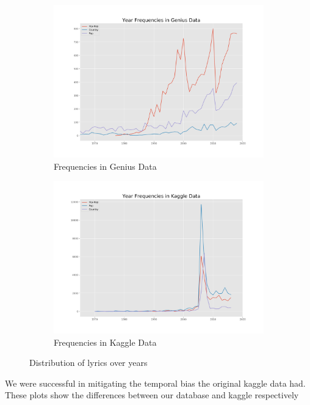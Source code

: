 \documentclass[11pt,a4paper]{article}
\begin{document}
\begin{figure}[t!]
\centering
\begin{subfigure}[t]{0.49\textwidth}
\centering
\includegraphics[width=\textwidth]{genius_histogram_line}
\caption{Frequencies in Genius Data}
\label{fig:histograms:genius}
\end{subfigure}
\begin{subfigure}[t]{0.49\textwidth}
\centering
\includegraphics[width=\textwidth]{kaggle_histogram_line}
\caption{Frequencies in Kaggle Data}
\label{fig:histograms:kaggle}
\end{subfigure}
\caption{Distribution of lyrics over years}
\label{fig:histograms}
\end{figure}
We were successful in mitigating the temporal bias the original kaggle data had. These plots show the differences between our database and kaggle respectively
\end{document}
